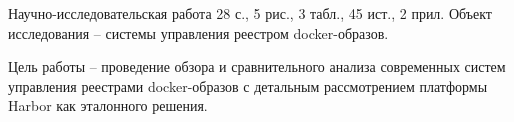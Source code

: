 
Научно-исследовательская работа 28 с., 5 рис., 3 табл., 45 ист., 2 прил.
Объект исследования -- системы управления реестром docker-образов.

Цель работы -- проведение обзора и сравнительного анализа современных систем управления реестрами docker-образов с детальным рассмотрением платформы Harbor как эталонного решения.
